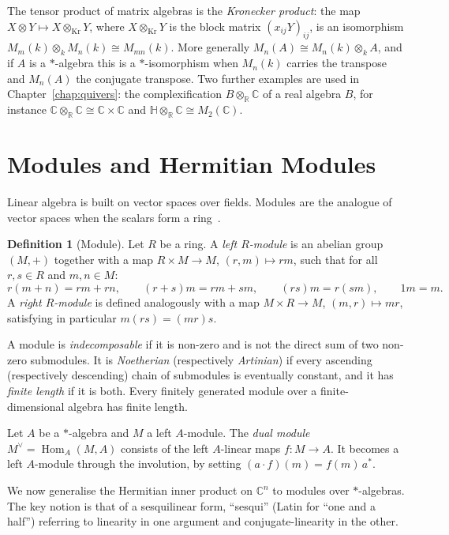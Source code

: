 \documentclass[12pt, a4paper]{report}
\theoremstyle{plain}
\theoremstyle{definition}
\newtheorem{definition}[theorem]{Definition}
\theoremstyle{remark}
\theoremstyle{plain}
\newcommand{\RR}{\mathbb{R}}
\newcommand{\CC}{\mathbb{C}}
\newcommand{\HH}{\mathbb{H}}
\DeclareMathOperator{\Hom}{Hom}
\begin{document}
The tensor product of matrix algebras is the \emph{Kronecker product}: the map $X\otimes Y\mapsto X\otimes_{\mathrm{Kr}}Y$, where $X\otimes_{\mathrm{Kr}} Y$ is the block matrix $(x_{ij}Y)_{ij}$, is an isomorphism $M_m(k)\otimes_kM_n(k)\cong M_{mn}(k)$. More generally $M_n(A)\cong M_n(k)\otimes_kA$, and if $A$ is a $*$-algebra this is a $*$-isomorphism when $M_n(k)$ carries the transpose and $M_n(A)$ the conjugate transpose. Two further examples are used in Chapter~\ref{chap:quivers}: the complexification $B\otimes_\RR\CC$ of a real algebra $B$, for instance $\CC\otimes_\RR\CC\cong\CC\times\CC$ and $\HH\otimes_\RR\CC\cong M_2(\CC)$.

\section{Modules and Hermitian Modules}
\label{sec:modules}
Linear algebra is built on vector spaces over fields. Modules are the analogue of vector spaces when the scalars form a ring~\cite{DummitFoote2003,Lam2001}.

\begin{definition}[Module]\label{def:module}
Let $R$ be a ring. A \emph{left $R$-module} is an abelian group $(M, +)$ together with a map $R \times M \to M$, $(r, m) \mapsto rm$, such that for all $r, s \in R$ and $m, n \in M$:
\[
 r(m+n) = rm + rn,\qquad (r+s)m = rm + sm,\qquad (rs)m = r(sm),\qquad 1m = m.
\]
A \emph{right $R$-module} is defined analogously with a map $M \times R \to M$, $(m,r)\mapsto mr$, satisfying in particular $m(rs) = (mr)s$.
\end{definition}

A module is \emph{indecomposable} if it is non-zero and is not the direct sum of two non-zero submodules. It is \emph{Noetherian} (respectively \emph{Artinian}) if every ascending (respectively descending) chain of submodules is eventually constant, and it has \emph{finite length} if it is both. Every finitely generated module over a finite-dimensional algebra has finite length.

Let $A$ be a $*$-algebra and $M$ a left $A$-module. The \emph{dual module} $M^\vee=\Hom_A(M,A)$ consists of the left $A$-linear maps $f:M\to A$. It becomes a left $A$-module through the involution, by setting $(a\cdot f)(m)=f(m)\,a^*$.

We now generalise the Hermitian inner product on $\CC^n$ to modules over $*$-algebras. The key notion is that of a sesquilinear form, ``sesqui'' (Latin for ``one and a half'') referring to linearity in one argument and conjugate-linearity in the other.
\end{document}
